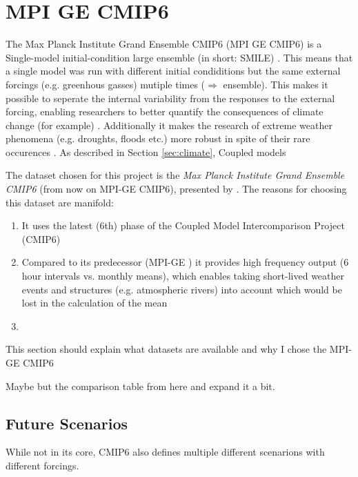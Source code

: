 \chapter{MPI GE CMIP6}
\label{ch:dataset}

The Max Planck Institute Grand Ensemble CMIP6 (MPI GE CMIP6) is a Single-model initial-condition large ensemble (in short: SMILE) \cite{olonscheck_new_2023}. 
This means that a single model was run with different initial condiditions but the same external forcings (e.g. greenhous gasses) mutiple times ($\Rightarrow$ ensemble). 
This makes it possible to seperate the internal variability from the responses to the external forcing, enabling researchers to better quantify the consequences of climate change (for example) . 
Additionally it makes the research of extreme weather phenomena (e.g. droughts, floods etc.) more robust in spite of their rare occurences \cite{maher_large_2021}. 
As described in Section \ref{sec:climate}, Coupled models 


The dataset chosen for this project is the \textit{Max Planck Institute Grand Ensemble CMIP6} (from now on MPI-GE CMIP6), presented by \citeauthor{olonscheck_new_2023} \cite{olonscheck_new_2023}. 
The reasons for choosing this dataset are manifold:

\begin{enumerate}
  \item It uses the latest (6th) phase of the Coupled Model Intercomparison Project (CMIP6)
  \item Compared to its predecessor (MPI-GE \cite{maher_max_2019}) it provides high frequency output (6 hour intervals vs. monthly means), which enables taking short-lived weather events and structures (e.g. atmospheric rivers) into account which would be lost in the calculation of the mean
  \item 
\end{enumerate}


This section should explain what datasets are available and why I chose the MPI-GE CMIP6 \cite{olonscheck_new_2023}

Maybe but the comparison table from \cite{olonscheck_new_2023} here and expand it a bit. 

\section{Future Scenarios}

While not in its core, CMIP6 also defines multiple different scenarions with different forcings. 

